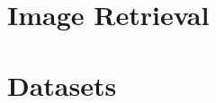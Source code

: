 





\section{Image Retrieval}
\label{sec:back:image-retrieval}


\section{Datasets}
\label{sec:back:datasets}
